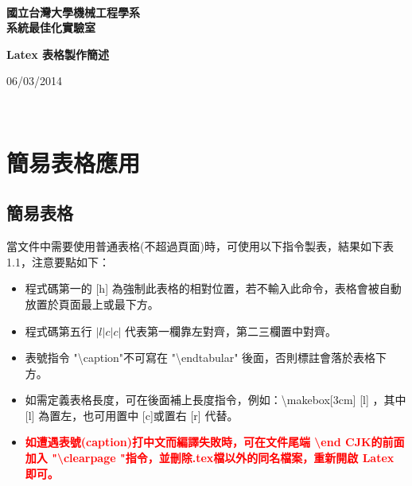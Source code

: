 \documentclass[12pt,a4paper]{report}
\begin{document}
\begin{CJK}{UTF8}{bkai}
\thispagestyle{empty}
\begin{center}
       ~\\
        \vspace{6.8cm}

        \textbf{\Huge
國立台灣大學機械工程學系 \\
系統最佳化實驗室}

        \vspace{3cm}

        \textbf{\Huge
	Latex 表格製作簡述
        }
        \vspace{11.5cm}

        {\large
            06/03/2014
        }
    \end{center}

\newpage

\tableofcontents
\listoftables

\thispagestyle{empty}
~
\newpage

\chapter{簡易表格應用}

\section{簡易表格}
當文件中需要使用普通表格(不超過頁面)時，可使用以下指令製表，結果如下表 1.1，注意要點如下：
\begin{itemize}
    \item 程式碼第一的 [h] 為強制此表格的相對位置，若不輸入此命令，表格會被自動放置於頁面最上或最下方。
    \item 程式碼第五行 $| l | c | c |$ 代表第一欄靠左對齊，第二三欄置中對齊。
    \item 表號指令 "\textbackslash caption"不可寫在 "\textbackslash end\textbraceleft tabular\textbraceright" 後面，否則標註會落於表格下方。
    \item 如需定義表格長度，可在後面補上長度指令，例如：\textbackslash makebox[3cm] [l] ，其中 [l] 為置左，也可用置中 [c]或置右 [r] 代替。
    \item {\bf \textcolor{red}{如遭遇表號(caption)打中文而編譯失敗時，可在文件尾端 \textbackslash end \textbraceleft CJK\textbraceright 的前面加入 "\textbackslash clearpage "指令，並刪除.tex檔以外的同名檔案，重新開啟 Latex 即可。}}


\end{itemize}
\end{CJK}
\end{document}
